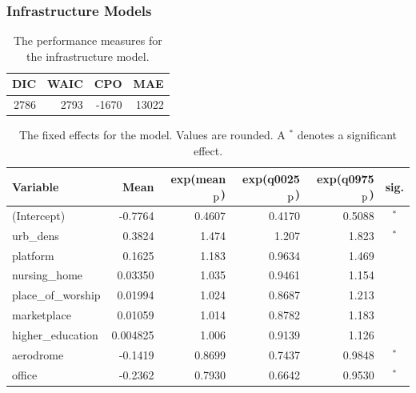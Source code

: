 \subsubsection{Infrastructure Models}
\begin{table}[H] 
\caption{The performance measures for the infrastructure model. \label{infraNorway_nospatial}}
\begin{tabular}{r r r r}
\toprule\textbf{DIC}	& \textbf{WAIC} & \textbf{CPO} & \textbf{MAE}\\
\midrule
2786 & 2793 & -1670 & 13022 \\
\bottomrule
\end{tabular}
\end{table} 
\begin{table}[H]
\caption{The fixed effects for the model. Values are rounded. A $^*$ denotes a significant effect. \label{fixedInfraNorway_nospatial}}
\begin{tabular}{l r r r r c}
\toprule
\textbf{Variable}	& \textbf{Mean}	& \textbf{exp(mean$_{\hbox{p}}$)} & \textbf{exp(q0025$_{\hbox{p}}$)} & \textbf{exp(q0975$_{\hbox{p}}$)} & \textbf{sig.}\\
\midrule
(Intercept) & -0.7764 & 0.4607 & 0.4170 & 0.5088 & $^*$ \\
urb\_dens & 0.3824 & 1.474 & 1.207 & 1.823 & $^*$ \\
platform & 0.1625 & 1.183 & 0.9634 & 1.469 \\
nursing\_home & 0.03350 & 1.035 & 0.9461 & 1.154\\
place\_of\_worship & 0.01994 &1.024 & 0.8687 & 1.213 \\
marketplace & 0.01059 & 1.014 & 0.8782 & 1.183 \\
higher\_education & 0.004825 & 1.006 & 0.9139 & 1.126 \\
aerodrome & -0.1419 & 0.8699 & 0.7437 & 0.9848 & $^*$ \\
office & -0.2362 & 0.7930 & 0.6642 & 0.9530 & $^*$ \\
\bottomrule
\end{tabular}
\end{table}
